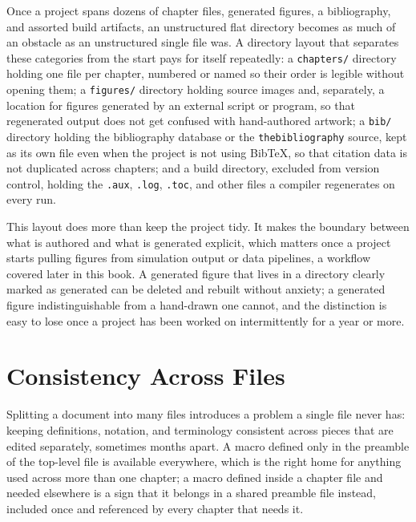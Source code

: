 Once a project spans dozens of chapter files, generated figures, a bibliography, and assorted build artifacts, an unstructured flat directory becomes as much of an obstacle as an unstructured single file was. A directory layout that separates these categories from the start pays for itself repeatedly: a \texttt{chapters/} directory holding one file per chapter, numbered or named so their order is legible without opening them; a \texttt{figures/} directory holding source images and, separately, a location for figures generated by an external script or program, so that regenerated output does not get confused with hand-authored artwork; a \texttt{bib/} directory holding the bibliography database or the \texttt{thebibliography} source, kept as its own file even when the project is not using BibTeX, so that citation data is not duplicated across chapters; and a build directory, excluded from version control, holding the \texttt{.aux}, \texttt{.log}, \texttt{.toc}, and other files a compiler regenerates on every run.

This layout does more than keep the project tidy. It makes the boundary between what is authored and what is generated explicit, which matters once a project starts pulling figures from simulation output or data pipelines, a workflow covered later in this book. A generated figure that lives in a directory clearly marked as generated can be deleted and rebuilt without anxiety; a generated figure indistinguishable from a hand-drawn one cannot, and the distinction is easy to lose once a project has been worked on intermittently for a year or more.

\hypertarget{consistency-across-files}{%
\section{Consistency Across Files}\label{consistency-across-files}}

Splitting a document into many files introduces a problem a single file never has: keeping definitions, notation, and terminology consistent across pieces that are edited separately, sometimes months apart. A macro defined only in the preamble of the top-level file is available everywhere, which is the right home for anything used across more than one chapter; a macro defined inside a chapter file and needed elsewhere is a sign that it belongs in a shared preamble file instead, included once and referenced by every chapter that needs it.

